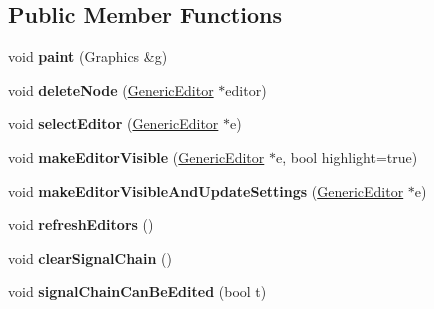 \subsection*{Public Member Functions}
\begin{DoxyCompactItemize}
\item 
\hypertarget{classEditorViewport_a9e1acddb0e1bd9de0ee5c144d65d231b}{void {\bfseries paint} (Graphics \&g)}\label{classEditorViewport_a9e1acddb0e1bd9de0ee5c144d65d231b}

\item 
\hypertarget{classEditorViewport_ad0b9dfd4b77ca870e76f174032e12fd0}{void {\bfseries delete\-Node} (\hyperlink{classGenericEditor}{Generic\-Editor} $\ast$editor)}\label{classEditorViewport_ad0b9dfd4b77ca870e76f174032e12fd0}

\item 
\hypertarget{classEditorViewport_aa788025ac31951eb6b3db55f5da19350}{void {\bfseries select\-Editor} (\hyperlink{classGenericEditor}{Generic\-Editor} $\ast$e)}\label{classEditorViewport_aa788025ac31951eb6b3db55f5da19350}

\item 
\hypertarget{classEditorViewport_a48ffa818358a263ac61221d5e94a14cc}{void {\bfseries make\-Editor\-Visible} (\hyperlink{classGenericEditor}{Generic\-Editor} $\ast$e, bool highlight=true)}\label{classEditorViewport_a48ffa818358a263ac61221d5e94a14cc}

\item 
\hypertarget{classEditorViewport_a70a4e6431ea881b26efcecab2ce9f736}{void {\bfseries make\-Editor\-Visible\-And\-Update\-Settings} (\hyperlink{classGenericEditor}{Generic\-Editor} $\ast$e)}\label{classEditorViewport_a70a4e6431ea881b26efcecab2ce9f736}

\item 
\hypertarget{classEditorViewport_a2537b32aa2b8e90835770e5543ba3da7}{void {\bfseries refresh\-Editors} ()}\label{classEditorViewport_a2537b32aa2b8e90835770e5543ba3da7}

\item 
\hypertarget{classEditorViewport_a02c672bb7b4695eec9c6c61eaac389bf}{void {\bfseries clear\-Signal\-Chain} ()}\label{classEditorViewport_a02c672bb7b4695eec9c6c61eaac389bf}

\item 
\hypertarget{classEditorViewport_a507e141c15a124aef3c307bab7e4e5c6}{void {\bfseries signal\-Chain\-Can\-Be\-Edited} (bool t)}\label{classEditorViewport_a507e141c15a124aef3c307bab7e4e5c6}


\end{DoxyCompactItemize}
